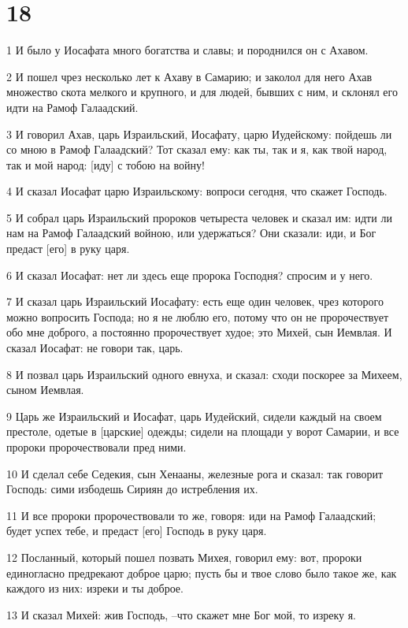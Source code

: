 \chapter{18}

\par 1 И было у Иосафата много богатства и славы; и породнился он с Ахавом.
\par 2 И пошел чрез несколько лет к Ахаву в Самарию; и заколол для него Ахав множество скота мелкого и крупного, и для людей, бывших с ним, и склонял его идти на Рамоф Галаадский.
\par 3 И говорил Ахав, царь Израильский, Иосафату, царю Иудейскому: пойдешь ли со мною в Рамоф Галаадский? Тот сказал ему: как ты, так и я, как твой народ, так и мой народ: [иду] с тобою на войну!
\par 4 И сказал Иосафат царю Израильскому: вопроси сегодня, что скажет Господь.
\par 5 И собрал царь Израильский пророков четыреста человек и сказал им: идти ли нам на Рамоф Галаадский войною, или удержаться? Они сказали: иди, и Бог предаст [его] в руку царя.
\par 6 И сказал Иосафат: нет ли здесь еще пророка Господня? спросим и у него.
\par 7 И сказал царь Израильский Иосафату: есть еще один человек, чрез которого можно вопросить Господа; но я не люблю его, потому что он не пророчествует обо мне доброго, а постоянно пророчествует худое; это Михей, сын Иемвлая. И сказал Иосафат: не говори так, царь.
\par 8 И позвал царь Израильский одного евнуха, и сказал: сходи поскорее за Михеем, сыном Иемвлая.
\par 9 Царь же Израильский и Иосафат, царь Иудейский, сидели каждый на своем престоле, одетые в [царские] одежды; сидели на площади у ворот Самарии, и все пророки пророчествовали пред ними.
\par 10 И сделал себе Седекия, сын Хенааны, железные рога и сказал: так говорит Господь: сими избодешь Сириян до истребления их.
\par 11 И все пророки пророчествовали то же, говоря: иди на Рамоф Галаадский; будет успех тебе, и предаст [его] Господь в руку царя.
\par 12 Посланный, который пошел позвать Михея, говорил ему: вот, пророки единогласно предрекают доброе царю; пусть бы и твое слово было такое же, как каждого из них: изреки и ты доброе.
\par 13 И сказал Михей: жив Господь, --что скажет мне Бог мой, то изреку я.
